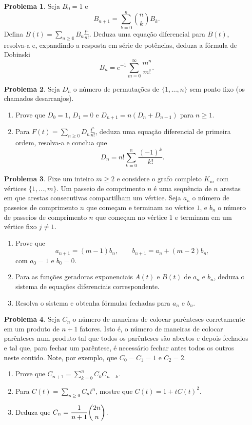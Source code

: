 \documentclass[10pt,a4paper]{amsart}
\theoremstyle{definition}
\newtheorem{problema}{Problema}
\begin{document}
\begin{problema}
Seja $B_0=1$ e
\[
    B_{n+1}=\sum_{k=0}^n \binom{n}{k}B_k.
\]
Defina $B(t)=\sum_{n\ge 0}B_n\frac{t^n}{n!}$. Deduza uma equação
diferencial para $B(t)$, resolva-a e, expandindo a resposta em série de
potências, deduza a fórmula de Dobinski
\[
    B_n=e^{-1}\sum_{m=0}^{\infty}\frac{m^n}{m!}.
\]
\end{problema}

\begin{problema}
Seja $D_n$ o número de permutações de $\{1,\ldots,n\}$ sem ponto fixo (os
chamados desarranjos).
\begin{enumerate}[label=(\alph*)]
    \item Prove que $D_0=1$, $D_1=0$ e $D_{n+1}=n(D_n+D_{n-1})$ para
    $n\ge 1$.
    \item Para $F(t)=\sum_{n\ge 0}D_n\frac{t^n}{n!}$, deduza uma equação
    diferencial de primeira ordem, resolva-a e conclua que
    \[
        D_n=n!\sum_{k=0}^n \frac{(-1)^k}{k!}.
    \]
\end{enumerate}
\end{problema}

\begin{problema}
Fixe um inteiro $m\ge 2$ e considere o grafo completo $K_m$ com vértices
$\{1,\ldots,m\}$. Um passeio de comprimento $n$ é uma sequência de $n$
arestas em que arestas consecutivas compartilham um vértice. Seja $a_n$ o
número de passeios de comprimento $n$ que começam e terminam no vértice $1$,
e $b_n$ o número de passeios de comprimento $n$ que começam no vértice $1$ e
terminam em um vértice fixo $j\neq 1$.
\begin{enumerate}[label=(\alph*)]
    \item Prove que
    \[
        a_{n+1}=(m-1)b_n,\qquad b_{n+1}=a_n+(m-2)b_n,
    \]
    com $a_0=1$ e $b_0=0$.
    \item Para as funções geradoras exponenciais $A(t)$ e $B(t)$ de $a_n$ e
    $b_n$, deduza o sistema de equações diferenciais correspondente.
    \item Resolva o sistema e obtenha fórmulas fechadas para $a_n$ e $b_n$.
\end{enumerate}
\end{problema}

\begin{problema}
Seja $C_n$ o número de maneiras de colocar parênteses corretamente em um
produto de $n+1$ fatores. Isto é, o número de maneiras de colocar parênteses num produto tal que todos os parênteses são abertos e depois fechados e tal que, para fechar um parêntese, é necessário fechar antes todos os outros neste contido. Note, por exemplo, que $C_0=C_1=1$ e $C_2=2$.
\begin{enumerate}[label=(\alph*)]
    \item Prove que $C_{n+1}=\sum_{k=0}^n C_kC_{n-k}$.
    \item Para $C(t)=\sum_{n\ge 0}C_nt^n$, mostre que $C(t)=1+tC(t)^2$. 
    \item Deduza que $C_n=\dfrac{1}{n+1}\dbinom{2n}{n}$.
\end{enumerate}
\end{problema}
\end{document}
